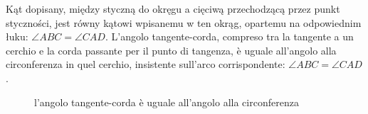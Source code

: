 \begin{proposition}
    Kąt dopisany, między styczną do okręgu a cięciwą przechodzącą przez punkt styczności, jest równy kątowi wpisanemu w ten okrąg, opartemu na odpowiednim łuku: $\angle ABC = \angle CAD$. %
    L'angolo tangente-corda, compreso tra la tangente a un cerchio e la corda passante per il punto di tangenza, è uguale all'angolo alla circonferenza in quel cerchio, insistente sull'arco corrispondente: $\angle ABC = \angle CAD$. %
\begin{figure}[H] \centering

    \caption{kąt dopisane jest równy wpisanemu} %
    \caption{l'angolo tangente-corda è uguale all'angolo alla circonferenza} %
\end{figure}
\end{proposition}


%